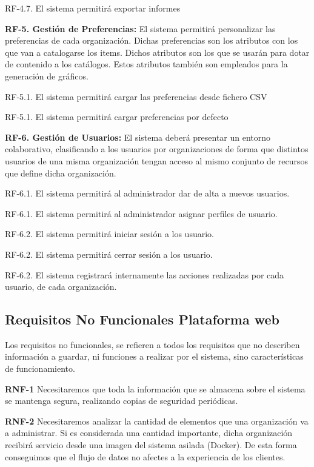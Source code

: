 \documentclass[a4paper,11pt]{book}
\begin{document}
	RF-4.7. El sistema permitirá exportar informes
	

\textbf{RF-5. Gestión de Preferencias:} El sistema permitirá personalizar las preferencias de cada organización. Dichas preferencias son los atributos con los que van a catalogarse los items. Dichos atributos son los que se usarán para dotar de contenido a los catálogos. Estos atributos también son empleados para la generación de gráficos. 


	RF-5.1. El sistema permitirá cargar las preferencias desde fichero CSV
	
	RF-5.1. El sistema permitirá cargar preferencias por defecto 
	
	

\textbf{RF-6. Gestión de Usuarios:} El sistema deberá presentar un entorno colaborativo, clasificando a los usuarios por organizaciones de forma que distintos usuarios de una misma organización tengan acceso al mismo conjunto de recursos que define dicha organización. 


	RF-6.1. El sistema permitirá al administrador dar de alta a nuevos usuarios.
	
	RF-6.1. El sistema permitirá al administrador asignar perfiles de usuario.
	
	RF-6.2. El sistema permitirá iniciar sesión a los usuario.
	
	RF-6.2. El sistema permitirá cerrar sesión a los usuario.
	
	RF-6.2. El sistema registrará internamente las acciones realizadas por cada 	usuario, 	de cada organización. 
	
	

\subsection{Requisitos No Funcionales Plataforma web}
Los requisitos no funcionales, se refieren a todos los requisitos que no describen información a guardar, ni funciones a realizar por el sistema, sino características de funcionamiento.


\textbf{RNF-1} Necesitaremos que toda la información que se almacena sobre el sistema se mantenga segura, realizando copias de seguridad periódicas.


\textbf{RNF-2} Necesitaremos analizar la cantidad de elementos que una organización va a administrar. Si es considerada una cantidad importante, dicha organización recibirá servicio desde una imagen del sistema asilada (Docker). De esta forma conseguimos que el flujo de datos no afectes a la experiencia de los clientes.
\end{document}
